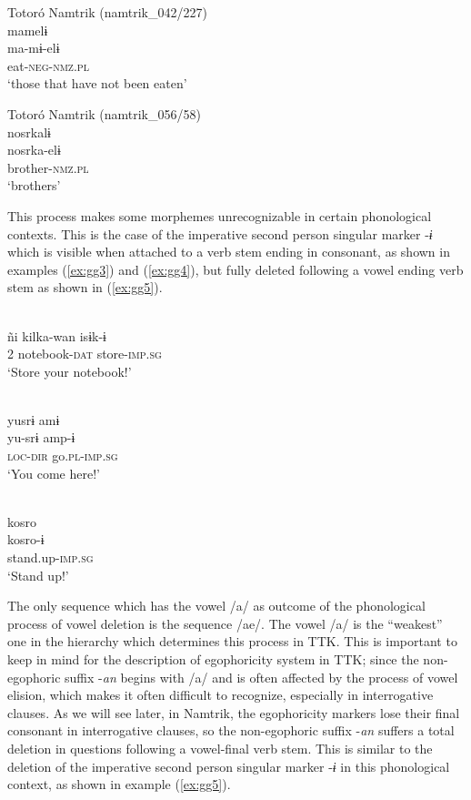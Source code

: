 \documentclass[output=paper]{langsci/langscibook}
\begin{document}
\ea Totoró Namtrik (namtrik\_042/227)\label{ex:gg1}\\
	\glll mamelɨ\\
	 ma-mɨ-elɨ \\
     eat-\textsc{neg-nmz.pl}\\
	\glt ‘those that have not been eaten’ %
	\z

\ea Totoró Namtrik (namtrik\_056/58)\label{ex:gg2}\\
	\glll nosrkalɨ\\
    nosrka-elɨ \\
    brother-\textsc{nmz.pl}\\
	\glt ‘brothers’ %
	\z
	
This process makes some morphemes unrecognizable in certain phonological contexts. This is the case of the imperative second person singular marker -\textit{ɨ} which is visible when attached to a verb stem ending in consonant, as shown in examples (\ref{ex:gg3}) and (\ref{ex:gg4}), but fully deleted following a vowel ending verb stem as shown in (\ref{ex:gg5}).

\ea \label{ex:gg3}
    \\
	\gll ñi	kilka-wan isɨk-ɨ \\
      2	notebook-\textsc{dat}  store-\textsc{imp.sg}\\
	\glt ‘Store your notebook!’
	\z
	
\ea \label{ex:gg4}
    \\
	\glll yusrɨ	amɨ\\
	yu-srɨ	amp-ɨ \\
      \textsc{loc-dir} go.\textsc{pl-imp.sg}\\
	\glt ‘You come here!’
	\z
	
\ea \label{ex:gg5}
    \\
	\glll kosro\\
	kosro-ɨ\\
      stand.up-\textsc{imp.sg}\\
	\glt ‘Stand up!’
	\z
	
The only sequence which has the vowel /a/ as outcome of the phonological process of vowel deletion is the sequence /ae/. The vowel /a/ is the ``weakest'' one in the hierarchy which determines this process in TTK. This is important to keep in mind for the description of egophoricity system in TTK; since the non-egophoric suffix -\textit{an} begins with /a/ and is often affected by the process of vowel elision, which makes it often difficult to recognize, especially in interrogative clauses. As we will see later, in Namtrik, the egophoricity markers lose their final consonant in interrogative clauses, so the non-egophoric suffix -\textit{an} suffers a total deletion in questions following a vowel-final verb stem. This is similar to the deletion of the imperative second person singular marker -\textit{ɨ} in this phonological context, as shown in example (\ref{ex:gg5}).
\end{document}
